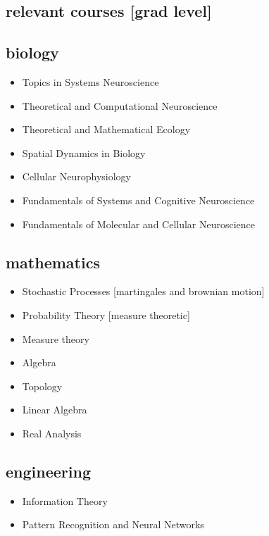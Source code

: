 \documentclass[11pt,print]{friggeri-cv}%
\begin{document}
\begin{multicols}{2}[]

\begin{minipage}{1.1\columnwidth}
\section{relevant courses [grad level]}


\subsection{biology}

\begin{itemize}
\item Topics in Systems Neuroscience
\item Theoretical and Computational Neuroscience
\item Theoretical and Mathematical Ecology
\item Spatial Dynamics in Biology
\item Cellular Neurophysiology
\item Fundamentals of Systems and Cognitive Neuroscience
\item Fundamentals of Molecular and Cellular Neuroscience
\end{itemize}


\subsection{mathematics}
\begin{itemize}

\item Stochastic Processes {\small[martingales and brownian motion]}
\item Probability Theory {\small[measure theoretic]}
\item Measure theory
\item Algebra
\item Topology
\item Linear Algebra
\item Real Analysis
\end{itemize}

\subsection{engineering}
\begin{itemize}
\item Information Theory
\item Pattern Recognition and Neural Networks
\end{itemize}
\vspace{1em}

\end{minipage}
\end{multicols}
\end{document}

